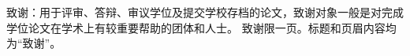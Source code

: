 \begin{acknowledgement}
	致谢：用于评审、答辩、审议学位及提交学校存档的论文，致谢对象一般是对完成学位论文在学术上有较重要帮助的团体和人士。
	致谢限一页。标题和页眉内容均为“致谢”。
	
\end{acknowledgement}
